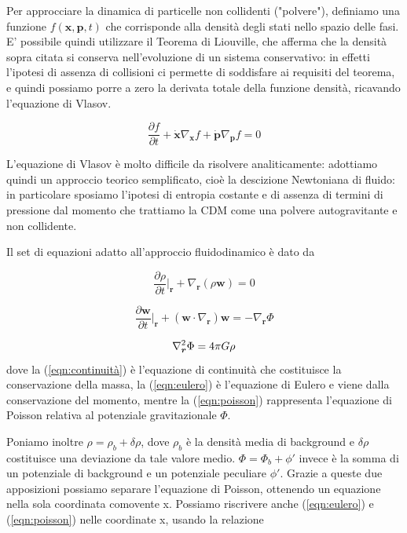 Per approcciare la dinamica di particelle non collidenti ("polvere"), definiamo una funzione $f(\bm{x}, \bm{p}, t)$ 
che corrisponde alla densità degli stati nello spazio delle fasi. E' possibile quindi utilizzare il Teorema di 
Liouville, che afferma che la densità sopra citata si conserva nell'evoluzione di un sistema conservativo: in
effetti l'ipotesi di assenza di collisioni ci permette di soddisfare ai requisiti del teorema, e quindi 
possiamo porre a zero la derivata totale della funzione densità, ricavando l'equazione di Vlasov.

\begin{equation}
    \label{eqn:vlasov}
    \frac{\partial f}{\partial t} + \dot{\bm{x}} \nabla_{\bm{x}}f + \dot{\bm{p}} \nabla_{\bm{p}}f  = 0
\end{equation}

L'equazione di Vlasov è molto difficile da risolvere analiticamente: adottiamo quindi un approccio 
teorico semplificato, cioè la descizione Newtoniana di fluido: in particolare sposiamo l'ipotesi 
di entropia costante e di assenza di termini di pressione dal momento che trattiamo la CDM come 
una polvere autogravitante e non collidente.

Il set di equazioni adatto all'approccio fluidodinamico è dato da

\begin{equation}
    \label{eqn:continuità}
    \frac{\partial\rho}{\partial t}\biggr|_{\bm{r}} + \nabla_{\bm{r}}(\rho \bm{w}) = 0
\end{equation}

\begin{equation}
    \label{eqn:eulero}
    \frac{\partial\bm{w}}{\partial t}\biggr|_{\bm{r}} + (\bm{w}\cdot\nabla_{\bm{r}})\bm{w} = - \nabla_{\bm{r}} \Phi
\end{equation}

\begin{equation}
    \label{eqn:poisson}
    \laplacian_{\bm{r}}\Phi = 4\pi G \rho
\end{equation}
dove la (\ref{eqn:continuità}) è l'equazione di continuità che costituisce la conservazione
della massa, la (\ref{eqn:eulero}) è l'equazione di Eulero e viene dalla conservazione del
momento, mentre la (\ref{eqn:poisson}) rappresenta l'equazione di Poisson relativa
al potenziale gravitazionale $\Phi$.

Poniamo inoltre $\rho = \rho_b + \delta\rho$, dove $\rho_b$ è la densità media di background
e $\delta\rho$ costituisce una deviazione da tale valore medio. $\Phi = \Phi_b + \phi{'}$ invece
è la somma di un potenziale di background e un potenziale peculiare $\phi{'}$. Grazie a queste due 
apposizioni possiamo separare l'equazione di Poisson, ottenendo un equazione nella sola coordinata
comovente x.
Possiamo riscrivere anche (\ref{eqn:eulero}) e (\ref{eqn:poisson}) nelle coordinate x, usando la
relazione

